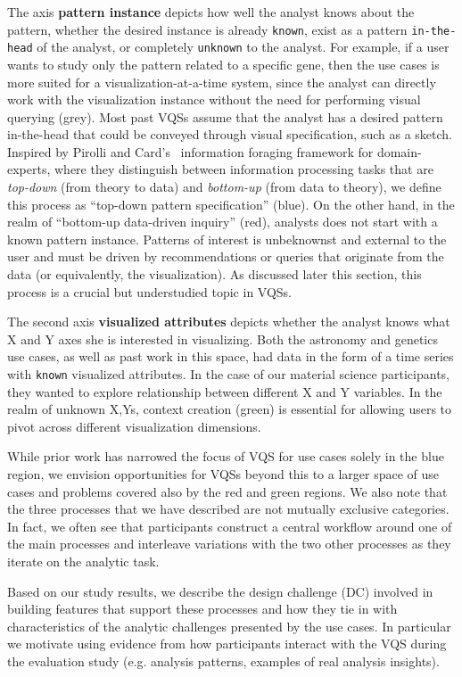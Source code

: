 \par The axis \textbf{pattern instance} depicts how well the analyst knows about the pattern, whether the desired instance is already \texttt{known}, exist as a pattern \texttt{in-the-head} of the analyst, or completely \texttt{unknown} to the analyst. For example, if a user wants to study only the pattern related to a specific gene, then the use cases is more suited for a visualization-at-a-time system, since the analyst can directly work with the visualization instance without the need for performing visual querying (grey). Most past VQSs assume that the analyst has a desired pattern in-the-head that could be conveyed through visual specification, such as a sketch. Inspired by Pirolli and Card's~\cite{Pirolli} information foraging framework for domain-experts, where they distinguish between information processing tasks that are \textit{top-down} (from theory to data) and \textit{bottom-up} (from data to theory), we define this process as ``top-down pattern specification'' (blue). On the other hand, in the realm of ``bottom-up data-driven inquiry'' (red), analysts does not start with a known pattern instance. Patterns of interest is unbeknownst and external to the user and must be driven by recommendations or queries that originate from the data (or equivalently, the visualization). As discussed later this section, this process is a crucial but understudied topic in VQSs.
\par The second axis \textbf{visualized attributes} depicts whether the analyst knows what X and Y axes she is interested in visualizing. Both the astronomy and genetics use cases, as well as past work in this space, had data in the form of a time series with \texttt{known} visualized attributes. In the case of our material science participants, they wanted to explore relationship between different X and Y variables. In the realm of unknown X,Ys, context creation (green) is essential for allowing users to pivot across different visualization dimensions.
\par While prior work has narrowed the focus of VQS for use cases solely in the blue region, we envision opportunities for VQSs beyond this to a larger space of use cases and problems covered also by the red and green regions. We also note that the three processes that we have described are not mutually exclusive categories. In fact, we often see that participants construct a central workflow around one of the main processes and interleave variations with the two other processes as they iterate on the analytic task. 
\par Based on our study results, we describe the design challenge (DC) involved in building features that support these processes and how they tie in with characteristics of the analytic challenges presented by the use cases. In particular we motivate using evidence from how participants interact with the VQS during the evaluation study (e.g. analysis patterns, examples of real analysis insights). 
